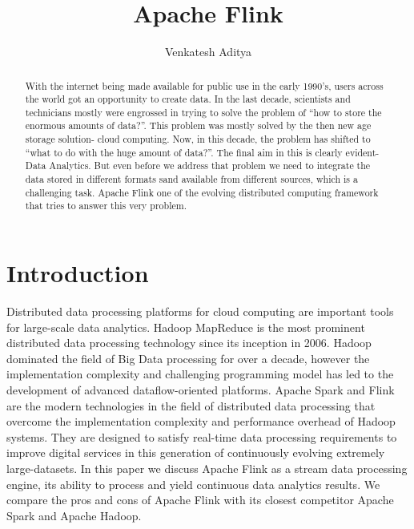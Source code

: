
\title{Apache Flink}


\author{Venkatesh Aditya}

\renewcommand{\shortauthors}{Venkatesh Aditya}




\begin{abstract}
With the internet being made available for public use in the early 1990's, users across the world got an opportunity to create data. In the last decade, scientists and technicians mostly were engrossed in trying to solve the problem of ``how to store the enormous amounts of data?''. This problem was mostly solved by the then new age storage solution- cloud computing. Now, in this decade, the problem has shifted to ``what to do with the huge amount of data?''. The final aim in this is clearly evident- Data Analytics. But even before we address that problem we need to integrate the data stored in different formats sand available from different sources, which is a challenging task. Apache Flink one of the evolving distributed computing framework that tries to answer this very problem.
\end{abstract}


\maketitle

\section{Introduction}

Distributed data processing platforms for cloud computing are important tools for large-scale data analytics. Hadoop MapReduce is the most prominent distributed data processing technology since its inception in 2006. Hadoop dominated the field of Big Data processing for over a decade, however the implementation complexity and challenging programming model has led to the development of advanced dataflow-oriented platforms. Apache Spark and Flink are the modern technologies in the field of distributed data processing that overcome the implementation complexity and performance overhead of Hadoop systems. They are designed to satisfy real-time data processing requirements to improve digital services in this generation of continuously evolving extremely large-datasets. In this paper we discuss Apache Flink as a stream data processing engine, its ability to process and yield continuous data analytics results. We compare the pros and cons of Apache Flink with its closest competitor Apache Spark and Apache Hadoop. 

